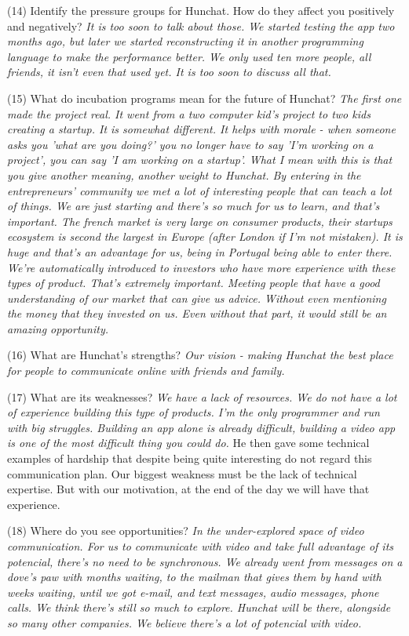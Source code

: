 \documentclass[11pt]{article}
\begin{document}
(14) Identify the pressure groups for Hunchat. How do they affect you positively and negatively? \textit{It is too soon to talk about those. We started testing the app two months ago, but later we started reconstructing it in another programming language to make the performance better. We only used ten more people, all friends, it isn't even that used yet. It is too soon to discuss all that. }

(15) What do incubation programs mean for the future of Hunchat? \textit{The first one made the project real. It went from a two computer kid's project to two kids creating a startup. It is somewhat different. It helps with morale - when someone asks you 'what are you doing?' you no longer have to say 'I'm working on a project', you can say 'I am working on a startup'. What I mean with this is that you give another meaning, another weight to Hunchat. By entering in the entrepreneurs' community we met a lot of interesting people that can teach a lot of things. We are just starting and there's so much for us to learn, and that's important. The french market is very large on consumer products, their startups ecosystem is second the largest in Europe (after London if I'm not mistaken). It is huge and that's an advantage for us, being in Portugal being able to enter there. We're automatically introduced to investors who have more experience with these types of product. That's extremely important. Meeting people that have a good understanding of our market that can give us advice. Without even mentioning the money that they invested on us. Even without that part, it would still be an amazing opportunity.}

(16) What are Hunchat’s strengths? \textit{Our vision - making Hunchat the best place for people to communicate online with friends and family.}

(17) What are its weaknesses? \textit{We have a lack of resources. We do not have a lot of experience building this type of products. I'm the only programmer and run with big struggles. Building an app alone is already difficult, building a video app is one of the most difficult thing you could do.} He then gave some technical examples of hardship that despite being quite interesting do not regard this communication plan. {Our biggest weakness must be the lack of technical expertise. But with our motivation, at the end of the day we will have that experience.}

(18) Where do you see opportunities? \textit{In the under-explored space of video communication. For us to communicate with video and take full advantage of its potencial, there's no need to be synchronous. We already went from messages on a dove's paw with months waiting, to the mailman that gives them by hand with weeks waiting, until we got e-mail, and text messages, audio messages, phone calls. We think there's still so much to explore. Hunchat will be there, alongside so many other companies. We believe there's a lot of potencial with video.}
\end{document}
